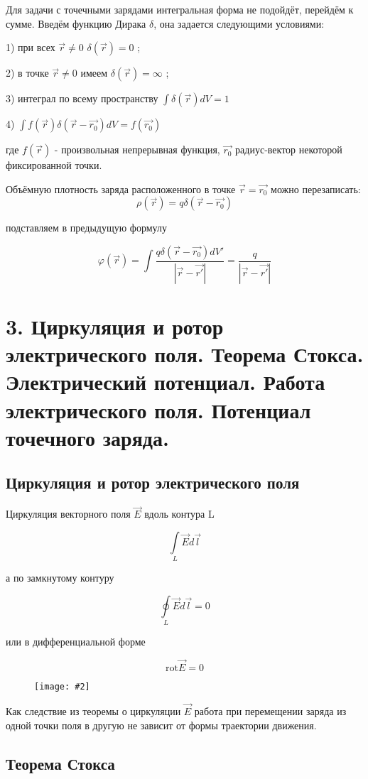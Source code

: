 \documentclass[a4paper,12pt]{article}
\newcommand{\fc}[1]{\[#1\]}
\newcommand{\mm}[1]{\mathrm{#1}}
\newcommand{\imc}[2][0.7\textwidth]{%
    \begin{figure}[h!]
        \centering
        \texttt{[image: \#2]}
    \end{figure}%
}
\begin{document}
Для задачи с точечными зарядами интегральная форма не подойдёт, перейдём к
сумме. Введём функцию Дирака $\delta$, она задается следующими условиями:

1) при всех $\vec{r} \neq 0$ $\delta(\vec{r})=0$ ;

2) в точке $\vec{r}\neq 0$ имеем $\delta(\vec{r})=\infty$ ;

3) интеграл по всему пространству $\int\delta(\vec{r})dV=1$

4) $\int f(\vec{r})\delta(\vec{r}-\vec{r_0})dV=f(\vec{r_0})$

где $f(\vec{r})$ - произвольная непрерывная функция, $\vec{r_0}$
радиус-вектор некоторой фиксированной точки.

Объёмную плотность заряда расположенного в точке $\vec{r}=\vec{r_0}$ можно
перезаписать:
\fc{\rho(\vec{r})=q\delta(\vec{r}-\vec{r_0})}

подставляем в предыдущую формулу

\fc{\varphi (\vec{r})=\int
\frac{q\delta(\vec{r}-\vec{r_0})dV'}{|\vec{r}-\vec{r'}|}=\frac{q}{|\vec{r}-\vec
{r'}|}}

\newpage


\section*{3. Циркуляция и ротор электрического поля. Теорема Стокса. Электрический
потенциал. Работа электрического поля. Потенциал точечного заряда.}

\subsection*{Циркуляция и ротор электрического поля}

Циркуляция векторного поля $\vec{E}$ вдоль контура L

\fc{\underset{L}{\int} \vec{E} d\vec{l}} 

а по замкнутому контуру

\fc{\underset{L}{\oint} \vec{E} d\vec{l}=0} 

или в дифференциальной форме 

\fc{\mm{rot}\vec{E}=0}

\imc[0.5\textwidth]{5.png} 

Как следствие из теоремы о циркуляции $\vec{E}$ работа при перемещении
заряда из одной точки поля в другую не зависит от формы траектории движения.

\newpage


\subsection*{Теорема Стокса}
\end{document}
